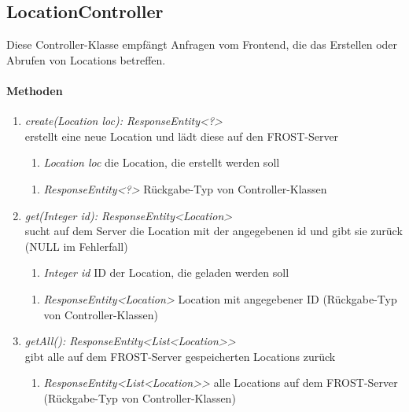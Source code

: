 \subsection{LocationController}
Diese Controller-Klasse empfängt Anfragen vom Frontend, die das Erstellen oder Abrufen von Locations betreffen.

\paragraph{Methoden}

\begin{enumerate}[+]
	\item \textit{ create(Location loc): ResponseEntity<?> }\\
	erstellt eine neue Location und lädt diese auf den FROST-Server
	
	\begin{enumerate}[$\bullet$]
		\item \textit{Location loc} die Location, die erstellt werden soll
		
	\end{enumerate}
	\vspace{-0.2cm}
	\begin{enumerate}[$\circ$]
		\item \textit{ResponseEntity<?>} Rückgabe-Typ von Controller-Klassen
	\end{enumerate}
	
	\item \textit{ get(Integer id): ResponseEntity<Location> }\\
	sucht auf dem Server die Location mit der angegebenen id und gibt sie zurück (NULL im Fehlerfall)
	
	\begin{enumerate}[$\bullet$]
		\item \textit{Integer id} ID der Location, die geladen werden soll
		
	\end{enumerate}
	\vspace{-0.2cm}
	\begin{enumerate}[$\circ$]
		\item \textit{ResponseEntity<Location>} Location mit angegebener ID (Rückgabe-Typ von Controller-Klassen)
	\end{enumerate}
	\item \textit{ getAll(): ResponseEntity<List<Location>> }\\
	gibt alle auf dem FROST-Server gespeicherten Locations zurück
	
	\begin{enumerate}[$\circ$]
		\item \textit{ResponseEntity<List<Location>>} alle Locations auf dem FROST-Server (Rückgabe-Typ von Controller-Klassen)
	\end{enumerate}
	
	
\end{enumerate}	